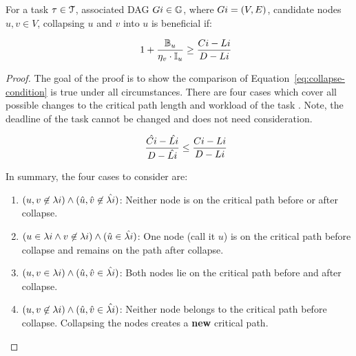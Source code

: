 \begin{theorem} For a task
  ${\task{i} \in \tasks{}}$, associated DAG ${\Dag{i} \in \dagset}$,
  where ${\Dag{i} = (V, E)}$, candidate nodes ${u,v \in V}$,
  collapsing ${u}$ and ${v}$ into ${u}$ is beneficial if:

  \begin{equation}
    \indent
    1 + \frac{\mathbb{B}_u}{\eta_v \cdot \mathbb{I}_u}
    \ge
    \frac{\workload{i} - \criticalpathlen{i}}
         {\Deadline{i} - \criticalpathlen{i}}
    \label{eq:condition}
  \end{equation}

  \begin{proof}
    The goal of the proof is to show the comparison of
    Equation~\ref{eq:collapse-condition} is true
    under all circumstances. There are four cases which cover all
    possible changes to the critical path length and workload of the
    task . Note, the deadline of the task  cannot
    be changed and does not need consideration. 

    \begin{equation} \label{eq:collapse-condition}
      \indent
      \frac{\hat{\workload{i}} - \hat{\criticalpathlen{i}}}
           {\Deadline{i} - \hat{\criticalpathlen{i}}} \le
      \frac{\workload{i} - \criticalpathlen{i}}
           {\Deadline{i} - \criticalpathlen{i}}
    \end{equation}

    In summary, the four cases to consider are:

    \begin{enumerate}
    \item ${(u, v \not \in \criticalpath{i})
      \land
      (\hat{u}, \hat{v} \not \in \hat{\criticalpath{i}})}$:
      Neither node is on the critical path
      before or after collapse.
    \item ${(u \in \criticalpath{i} \land v \not \in \criticalpath{i})
      \land
      (\hat{u} \in \hat{\criticalpath{i}})}$: One node (call it ${u}$)
      is on the critical path before collapse and remains on the path
      after collapse.
    \item ${(u,v \in \criticalpath{i}) \land
      (\hat{u},\hat{v} \in \hat{\criticalpath{i}})}$: Both nodes lie
      on the critical path before and after collapse.
    \item ${(u,v \not \in \criticalpath{i}) \land
      (\hat{u},\hat{v} \in \hat{\criticalpath{i}})}$: Neither node
      belongs to the critical path before collapse. Collapsing the
      nodes creates a \textbf{new} critical path.
    \end{enumerate}


\end{proof}
\end{theorem}
